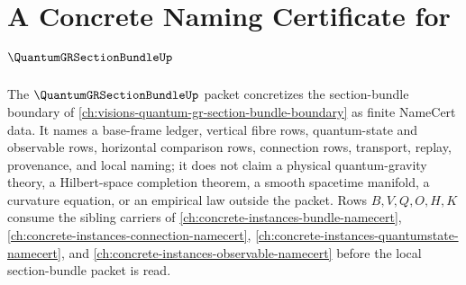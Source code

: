 \chapter{A Concrete Naming Certificate for $\QuantumGRSectionBundleUp$}
\label{ch:concrete-instances-quantum-gr-section-bundle-namecert}

The $\QuantumGRSectionBundleUp$ packet concretizes the section-bundle boundary of \autoref{ch:visions-quantum-gr-section-bundle-boundary} as finite NameCert data. It names a base-frame ledger, vertical fibre rows, quantum-state and observable rows, horizontal comparison rows, connection rows, transport, replay, provenance, and local naming; it does not claim a physical quantum-gravity theory, a Hilbert-space completion theorem, a smooth spacetime manifold, a curvature equation, or an empirical law outside the packet. Rows $B,V,Q,O,H,K$ consume the sibling carriers of \autoref{ch:concrete-instances-bundle-namecert}, \autoref{ch:concrete-instances-connection-namecert}, \autoref{ch:concrete-instances-quantumstate-namecert}, and \autoref{ch:concrete-instances-observable-namecert} before the local section-bundle packet is read.



